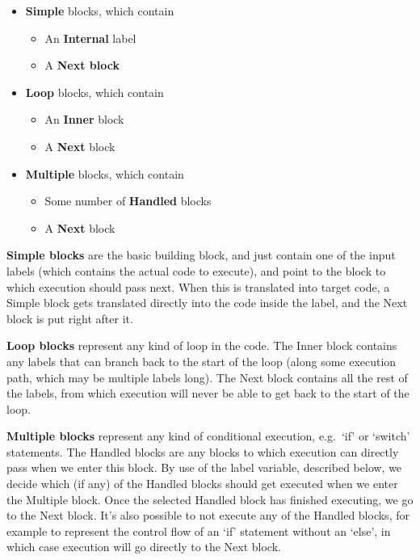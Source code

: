 \documentclass[10pt, a4paper]{article}
\begin{document}
\begin{itemize}
\item \textbf{Simple} blocks, which contain
\begin{itemize}
\item An \textbf{Internal} label
\item A \textbf{Next block}
\end{itemize}

\item \textbf{Loop} blocks, which contain
\begin{itemize}
\item An \textbf{Inner} block
\item A \textbf{Next} block
\end{itemize}

\item \textbf{Multiple} blocks, which contain
\begin{itemize}
\item Some number of \textbf{Handled} blocks
\item A \textbf{Next} block
\end{itemize}
\end{itemize}

\textbf{Simple blocks} are the basic building block, and just contain one of the input labels (which contains the actual code to execute), and point to the block to which execution should pass next.
When this is translated into target code, a Simple block gets translated directly into the code inside the label, and the Next block is put right after it.

\textbf{Loop blocks} represent any kind of loop in the code.
The Inner block contains any labels that can branch back to the start of the loop (along some execution path, which may be multiple labels long).
The Next block contains all the rest of the labels, from which execution will never be able to get back to the start of the loop.

\textbf{Multiple blocks} represent any kind of conditional execution, e.g.\ `if' or `switch' statements.
The Handled blocks are any blocks to which execution can directly pass when we enter this block.
By use of the label variable, described below, we decide which (if any) of the Handled blocks should get executed when we enter the Multiple block.
Once the selected Handled block has finished executing, we go to the Next block.
It's also possible to not execute any of the Handled blocks, for example to represent the control flow of an `if' statement without an `else', in which case execution will go directly to the Next block.
\end{document}
